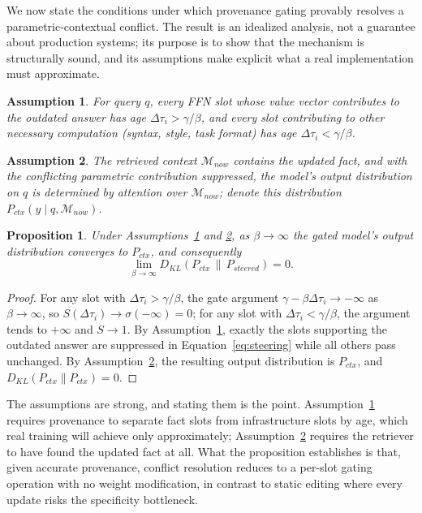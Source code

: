 \documentclass{article}
\newtheorem{proposition}{Proposition}
\newtheorem{assumption}{Assumption}
\begin{document}
We now state the conditions under which provenance gating provably resolves a parametric-contextual conflict. The result is an idealized analysis, not a guarantee about production systems; its purpose is to show that the mechanism is structurally sound, and its assumptions make explicit what a real implementation must approximate.

\begin{assumption}
\label{as:stale_support}
For query $q$, every FFN slot whose value vector contributes to the outdated answer has age $\Delta\tau_i > \gamma / \beta$, and every slot contributing to other necessary computation (syntax, style, task format) has age $\Delta\tau_i < \gamma / \beta$.
\end{assumption}

\begin{assumption}
\label{as:context_sufficiency}
The retrieved context $\mathcal{M}_{now}$ contains the updated fact, and with the conflicting parametric contribution suppressed, the model's output distribution on $q$ is determined by attention over $\mathcal{M}_{now}$; denote this distribution $P_{ctx}(y \mid q, \mathcal{M}_{now})$.
\end{assumption}

\begin{proposition}
\label{prop:consistency}
Under Assumptions~\ref{as:stale_support} and \ref{as:context_sufficiency}, as $\beta \to \infty$ the gated model's output distribution converges to $P_{ctx}$, and consequently
\begin{equation}
  \lim_{\beta \to \infty} D_{KL}\!\left( P_{ctx} \,\|\, P_{steered} \right) = 0.
\end{equation}
\end{proposition}

\begin{proof}
For any slot with $\Delta\tau_i > \gamma/\beta$, the gate argument $\gamma - \beta\Delta\tau_i \to -\infty$ as $\beta \to \infty$, so $S(\Delta\tau_i) \to \sigma(-\infty) = 0$; for any slot with $\Delta\tau_i < \gamma/\beta$, the argument tends to $+\infty$ and $S \to 1$. By Assumption~\ref{as:stale_support}, exactly the slots supporting the outdated answer are suppressed in Equation~\ref{eq:steering} while all others pass unchanged. By Assumption~\ref{as:context_sufficiency}, the resulting output distribution is $P_{ctx}$, and $D_{KL}(P_{ctx} \| P_{ctx}) = 0$.
\end{proof}

The assumptions are strong, and stating them is the point. Assumption~\ref{as:stale_support} requires provenance to separate fact slots from infrastructure slots by age, which real training will achieve only approximately; Assumption~\ref{as:context_sufficiency} requires the retriever to have found the updated fact at all. What the proposition establishes is that, given accurate provenance, conflict resolution reduces to a per-slot gating operation with no weight modification, in contrast to static editing where every update risks the specificity bottleneck.
\end{document}
